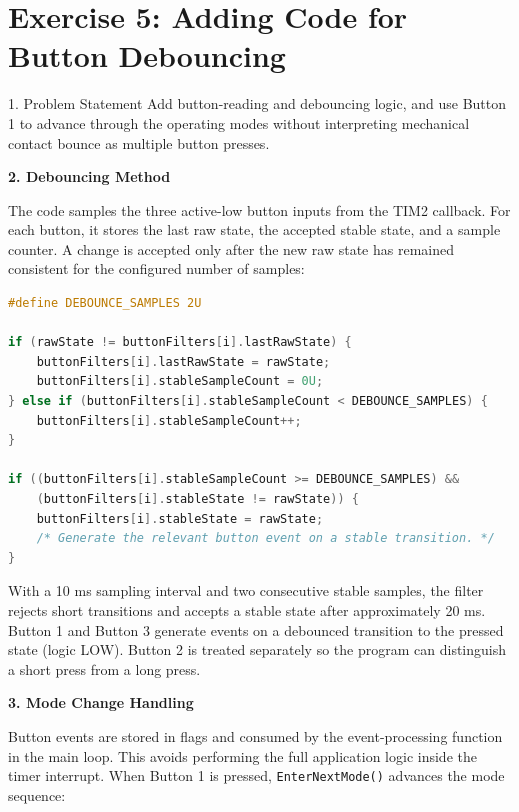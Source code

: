 \clearpage
\section*{Exercise 5: Adding Code for Button Debouncing}

\begin{questionbox}{1. Problem Statement}
Add button-reading and debouncing logic, and use Button 1 to advance through the operating modes without interpreting mechanical contact bounce as multiple button presses.
\end{questionbox}

\vspace{0.4cm}
\textbf{2. Debouncing Method}

The code samples the three active-low button inputs from the TIM2 callback. For each button, it stores the last raw state, the accepted stable state, and a sample counter. A change is accepted only after the new raw state has remained consistent for the configured number of samples:

\begin{lstlisting}[language=C, caption={Core stable-state filter from main.c}, label={lst:exercise5_debounce}, captionpos=b]
#define DEBOUNCE_SAMPLES 2U

if (rawState != buttonFilters[i].lastRawState) {
    buttonFilters[i].lastRawState = rawState;
    buttonFilters[i].stableSampleCount = 0U;
} else if (buttonFilters[i].stableSampleCount < DEBOUNCE_SAMPLES) {
    buttonFilters[i].stableSampleCount++;
}

if ((buttonFilters[i].stableSampleCount >= DEBOUNCE_SAMPLES) &&
    (buttonFilters[i].stableState != rawState)) {
    buttonFilters[i].stableState = rawState;
    /* Generate the relevant button event on a stable transition. */
}
\end{lstlisting}

With a 10 ms sampling interval and two consecutive stable samples, the filter rejects short transitions and accepts a stable state after approximately 20 ms. Button 1 and Button 3 generate events on a debounced transition to the pressed state (logic LOW). Button 2 is treated separately so the program can distinguish a short press from a long press.

\textbf{3. Mode Change Handling}

Button events are stored in flags and consumed by the event-processing function in the main loop. This avoids performing the full application logic inside the timer interrupt. When Button 1 is pressed, \texttt{EnterNextMode()} advances the mode sequence:

